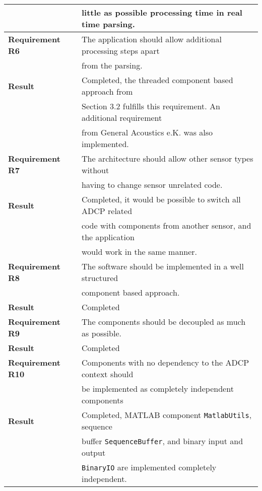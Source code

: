\begin{tabular}{|l|l|}
  	& little as possible processing time in real time parsing. \\
  \hline
  \hline
  	\textbf{Requirement R6} 
  	& The application should allow additional processing steps apart\\
  	& from the parsing.\\ \hline
  	\textbf{Result} 
  	& Completed, the threaded component based approach from\\
  	& Section 3.2 fulfills this requirement. An additional requirement\\
  	& from General Acoustics e.K. was also implemented.\\
  \hline
  \hline
  	\textbf{Requirement R7} 
  	& The architecture should allow other sensor types without\\
  	& having to change sensor unrelated code.\\ \hline
  	\textbf{Result} 
  	& Completed, it would be possible to switch all ADCP related\\
  	& code with components from another sensor, and the application\\
  	& would work in the same manner.\\
  \hline
  \hline
  	\textbf{Requirement R8} 
  	&  The software should be implemented in a well structured\\
  	& component based approach.\\ \hline
  	\textbf{Result} & Completed \\
  \hline
  \hline
  	\textbf{Requirement R9} & The components should be decoupled as much as possible.\\ \hline
  	\textbf{Result} & Completed \\
  \hline
  \hline
  	\textbf{Requirement R10} 
  	& Components with no dependency to the ADCP context should\\
  	& be implemented as completely independent components\\ \hline
  	\textbf{Result} 
  	& Completed, MATLAB component \texttt{MatlabUtils}, sequence\\
  	& buffer \texttt{SequenceBuffer}, and binary input and output\\
  	& \texttt{BinaryIO} are implemented completely independent.\\
  \hline
\end{tabular}


